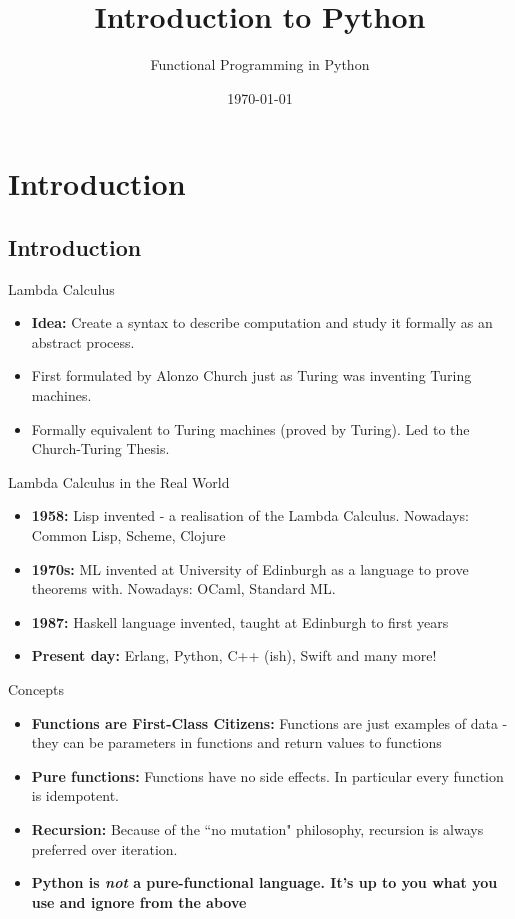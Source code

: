\documentclass{beamer}
\title{Introduction to Python}
\subtitle{Functional Programming in Python}
\date{\today}
\begin{document}
\lstset{language=Python}

\begin{frame}
  \titlepage
\end{frame}

\section{Introduction}

\subsection{Introduction}
\begin{frame}[fragile]{Lambda Calculus}
  \begin{itemize}
  \item {
  \textbf{Idea:} Create a syntax to describe computation and study it formally as an abstract process.
}
  
  \pause
  \item {
  First formulated by Alonzo Church just as Turing was inventing Turing machines.
 } 
 \pause
 \item {
Formally equivalent to Turing machines (proved by Turing). Led to the Church-Turing Thesis.
  }
  \end{itemize}
\end{frame}

\begin{frame}[fragile]{Lambda Calculus in the Real World}

\begin{itemize}
\item{ \textbf{1958:} Lisp invented - a realisation of the Lambda Calculus. Nowadays: Common Lisp, Scheme, Clojure}
\pause
\item{\textbf{1970s:} ML invented at University of Edinburgh as a language to prove theorems with. Nowadays: OCaml, Standard ML.
}
\pause
\item{\textbf{1987:} Haskell language invented, taught at Edinburgh to first years}
\pause
\item{\textbf{Present day:} Erlang, Python, C++ (ish), Swift and many more!}
\end{itemize}
\end{frame}


\begin{frame}[fragile]{Concepts}
	\begin{itemize}
	\item { \textbf{Functions are First-Class Citizens:} Functions are just examples of data - they can be parameters in functions and return values to functions
	}
	\pause
	\item{ \textbf{Pure functions:} Functions have no side effects. In particular every function is idempotent.
	}
\pause
\item{\textbf{Recursion:} Because of the ``no mutation" philosophy, recursion is always preferred over iteration.
}
\pause
\item{\textbf{Python is \emph{not} a pure-functional language. It's up to you what you use and ignore from the above
}}
\end{itemize}
\end{frame}
\end{document}
